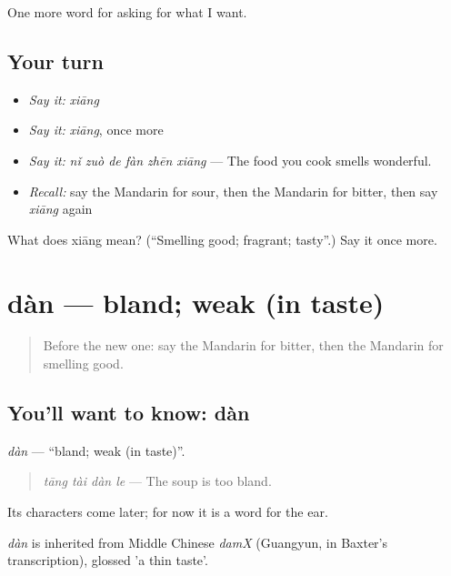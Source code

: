 \begin{grammarlens}[title={What you've built}]
One more word for asking for what I want.
\end{grammarlens}

\subsection*{Your turn}
\begin{itemize}
\raggedright
  \item \emph{Say it:} \emph{xiāng}
  \item \emph{Say it:} \emph{xiāng}, once more
  \item \emph{Say it:} \emph{nǐ zuò de fàn zhēn xiāng} — The food you cook smells wonderful.
  \item \emph{Recall:} say the Mandarin for sour, then the Mandarin for bitter, then say \emph{xiāng} again
\end{itemize}

\begin{tcolorbox}[breakable,colback=teal!4,colframe=teal!35!black,title={Before you move on}]
What does xiāng mean? (\textquotedblleft{}Smelling good; fragrant; tasty\textquotedblright{}.) Say it once more.
\end{tcolorbox}
\section[dàn]{dàn — bland; weak (in taste)}

\label{lesson:ZH-C172-dan}



\begin{quote}
Before the new one: say the Mandarin for bitter, then the Mandarin for smelling good.
\end{quote}

\subsection*{You'll want to know: dàn}
\emph{dàn} — \textquotedblleft{}bland; weak (in taste)\textquotedblright{}.

\begin{quote}
\emph{tāng tài dàn le} — The soup is too bland.
\end{quote}

Its characters come later; for now it is a word for the ear.

\begin{cousinweb}
\emph{dàn} is inherited from Middle Chinese \emph{damX} (Guangyun, in Baxter's transcription), glossed 'a thin taste'.
\end{cousinweb}

